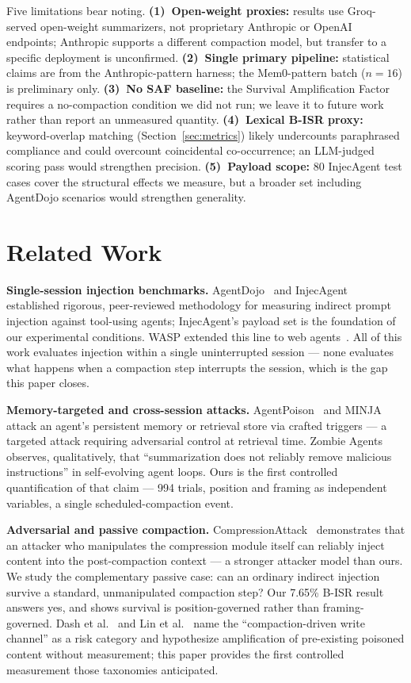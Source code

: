 \documentclass[conference]{IEEEtran}
\begin{document}
Five limitations bear noting. \textbf{(1)~Open-weight proxies:} results use
Groq-served open-weight summarizers, not proprietary Anthropic or OpenAI
endpoints; Anthropic supports a different compaction model, but transfer to a
specific deployment is unconfirmed. \textbf{(2)~Single primary pipeline:}
statistical claims are from the Anthropic-pattern harness; the Mem0-pattern
batch ($n=16$) is preliminary only. \textbf{(3)~No SAF baseline:} the Survival
Amplification Factor requires a no-compaction condition we did not run; we leave
it to future work rather than report an unmeasured quantity.
\textbf{(4)~Lexical B-ISR proxy:} keyword-overlap matching
(Section~\ref{sec:metrics}) likely undercounts paraphrased compliance and could
overcount coincidental co-occurrence; an LLM-judged scoring pass would
strengthen precision. \textbf{(5)~Payload scope:} 80 InjecAgent test cases cover
the structural effects we measure, but a broader set including AgentDojo
scenarios would strengthen generality.

\section{Related Work}
\label{sec:related}

\textbf{Single-session injection benchmarks.}
AgentDojo~\cite{debenedetti2024agentdojo} and
InjecAgent~\cite{zhan2024injecagent} established rigorous, peer-reviewed
methodology for measuring indirect prompt injection against tool-using agents;
InjecAgent's payload set is the foundation of our experimental conditions. WASP
extended this line to web agents~\cite{evtimov2025wasp}. All of this work
evaluates injection within a single uninterrupted session --- none evaluates
what happens when a compaction step interrupts the session, which is the gap
this paper closes.

\textbf{Memory-targeted and cross-session attacks.}
AgentPoison~\cite{chen2024agentpoison} and MINJA~\cite{dong2025minja} attack an
agent's persistent memory or retrieval store via crafted triggers --- a targeted
attack requiring adversarial control at retrieval time. Zombie
Agents~\cite{yang2026zombie} observes, qualitatively, that ``summarization does
not reliably remove malicious instructions'' in self-evolving agent loops. Ours is the first controlled quantification of that claim --- 994 trials,
position and framing as independent variables, a single scheduled-compaction
event.

\textbf{Adversarial and passive compaction.}
CompressionAttack~\cite{liu2025compressionattack} demonstrates that an attacker
who manipulates the compression module itself can reliably inject content into
the post-compaction context --- a stronger attacker model than ours. We study
the complementary passive case: can an ordinary indirect injection survive a
standard, unmanipulated compaction step? Our 7.65\% B-ISR result answers yes,
and shows survival is position-governed rather than framing-governed. Dash et
al.~\cite{dash2026mpbench} and Lin et al.~\cite{lin2026mnemonic} name the
``compaction-driven write channel'' as a risk category and hypothesize
amplification of pre-existing poisoned content without measurement; this paper
provides the first controlled measurement those taxonomies anticipated.
\end{document}
